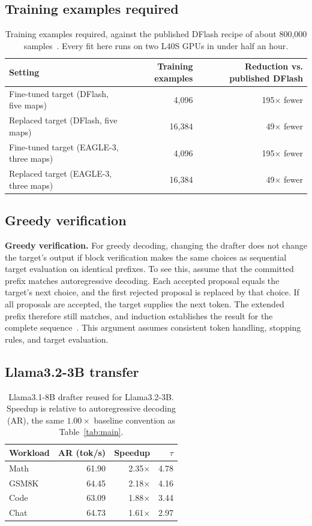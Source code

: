 \subsection{Training examples required}
\label{app:cost-table}
\begin{table}[t]
\centering
\caption{Training examples required, against the published DFlash recipe of about 800{,}000 samples~\citep{chen2026dflash}. Every fit here runs on two L40S GPUs in under half an hour.}
\label{tab:cost}
\small
\begin{tabular}{lrr}
\toprule
Setting & Training examples & Reduction vs. published DFlash \\
\midrule
Fine-tuned target (DFlash, five maps) & 4{,}096 & 195$\times$ fewer \\
Replaced target (DFlash, five maps) & 16{,}384 & 49$\times$ fewer \\
Fine-tuned target (EAGLE-3, three maps) & 4{,}096 & 195$\times$ fewer \\
Replaced target (EAGLE-3, three maps) & 16{,}384 & 49$\times$ fewer \\
\bottomrule
\end{tabular}
\end{table}

\subsection{Greedy verification}
\label{app:greedy}
\textbf{Greedy verification.} For greedy decoding, changing the drafter does not change the target's output if block verification makes the same choices as sequential target evaluation on identical prefixes. To see this, assume that the committed prefix matches autoregressive decoding. Each accepted proposal equals the target's next choice, and the first rejected proposal is replaced by that choice. If all proposals are accepted, the target supplies the next token. The extended prefix therefore still matches, and induction establishes the result for the complete sequence~\citep{leviathan2023speculative,chen2023sampling}. This argument assumes consistent token handling, stopping rules, and target evaluation.

\subsection{Llama3.2-3B transfer}
\label{app:llama-table}
\begin{table}[t]
\centering
\caption{Llama3.1-8B drafter reused for Llama3.2-3B. Speedup is relative to autoregressive decoding (AR), the same $1.00\times$ baseline convention as Table~\ref{tab:main}.}
\label{tab:llama-transfer}
\small
\begin{tabular}{lrrr}
\toprule
Workload & AR (tok/s) & Speedup & $\tau$ \\
\midrule
Math & 61.90 & 2.35$\times$ & 4.78 \\
GSM8K & 64.45 & 2.18$\times$ & 4.16 \\
Code & 63.09 & 1.88$\times$ & 3.44 \\
Chat & 64.73 & 1.61$\times$ & 2.97 \\
\bottomrule
\end{tabular}
\end{table}

